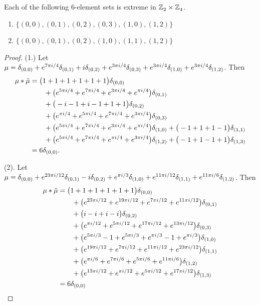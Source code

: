 \begin{prop}\label{prop6inZ2.X.Z4}
Each of the following 6-element sets  
is  extreme in $\texttt{$\mathbb Z_{2}^{\,}$} \times \texttt{$\mathbb Z_{4}^{\,}$}$. 
\begin{enumerate}
\item$\{(0, 0),  (0, 1),  (0, 2),  (0, 3),  (1, 0),  (1, 2) \}$
\item  $\{(0, 0),  (0, 1),  (0, 2),  (1, 0),  (1, 1),  (1, 2) \}$
\end{enumerate}
 \end{prop} 


 
\begin{proof}
(1.)
Let  $\mu =  \delta_{(0,0)}+e^{7\pi i/4}\delta_{(0,1)}+i\delta_{(0,2)}+e^{3\pi i/4}\delta_{(0,3)}+e^{3\pi i/4}\delta_{(1,0)}+e^{3\pi i/4}\delta_{(1,2)}
$.  Then 
\begin{align*} 
\mu * \tilde \mu & = \big(1+1+1+1+1+1\big)\delta_{(0,0)}
\\&\qquad
+\big(e^{5\pi i/4}+e^{7\pi i/4}+e^{3\pi i/4}+e^{\pi i/4}\big)\delta_{(0,1)}
\\&\qquad
+\big(-i-1+i-1+1+1\big)\delta_{(0,2)}
\\&\qquad
+\big(e^{\pi i/4}+e^{5\pi i/4}+e^{7\pi i/4}+e^{3\pi i/4}\big)\delta_{(0,3)}
\\&\qquad
+\big(e^{5\pi i/4}+e^{7\pi i/4}+e^{3\pi i/4}+e^{\pi i/4}\big)\delta_{(1,0)}
+\big(-1+1+1-1\big)\delta_{(1,1)}
\\&\qquad
+\big(e^{5\pi i/4}+e^{7\pi i/4}+e^{\pi i/4}+e^{3\pi i/4}\big)\delta_{(1,2)}
+\big(-1+1-1+1\big)\delta_{(1,3)}\\&=6\delta_{(0 , 0)}.
\end{align*}

(2).
Let  $\mu =  \delta_{(0,0)}+e^{23\pi i/12}\delta_{(0,1)}-i\delta_{(0,2)}+e^{\pi i/3}\delta_{(1,0)}+e^{11\pi i/12}\delta_{(1,1)}+e^{11\pi i/6}\delta_{(1,2)}
$.  Then 
\begin{align*} 
\mu * \tilde \mu & = \big(1+1+1+1+1+1\big)\delta_{(0,0)}
\\&\qquad
+\big(e^{23\pi i/12}+e^{19\pi i/12}+e^{7\pi i/12}+e^{11\pi i/12}\big)\delta_{(0,1)}
\\&\qquad
+\big(i-i+i-i\big)\delta_{(0,2)}
\\&\qquad
+\big(e^{\pi i/12}+e^{5\pi i/12}+e^{17\pi i/12}+e^{13\pi i/12}\big)\delta_{(0,3)}
\\&\qquad
+\big(e^{5\pi i/3}-1+e^{5\pi i/3}+e^{\pi i/3}-1+e^{\pi i/3}\big)\delta_{(1,0)}
\\&\qquad
+\big(e^{19\pi i/12}+e^{7\pi i/12}+e^{11\pi i/12}+e^{23\pi i/12}\big)\delta_{(1,1)}
\\&\qquad
+\big(e^{\pi i/6}+e^{7\pi i/6}+e^{5\pi i/6}+e^{11\pi i/6}\big)\delta_{(1,2)}
\\&\qquad
+\big(e^{13\pi i/12}+e^{\pi i/12}+e^{5\pi i/12}+e^{17\pi i/12}\big)\delta_{(1,3)}\\&=6\delta_{(0 , 0)}\qedhere
\end{align*}
\end{proof}





